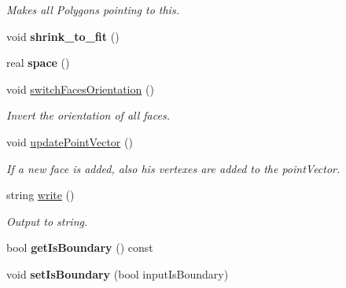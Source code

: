 \begin{DoxyCompactItemize}
\begin{DoxyCompactList}\small\item\em \-Makes all \-Polygons pointing to this. \end{DoxyCompactList}\item 
\hypertarget{class_polyhedron_a4972488920bf2dd7824175435829e475}{void {\bfseries shrink\-\_\-to\-\_\-fit} ()}\label{class_polyhedron_a4972488920bf2dd7824175435829e475}

\item 
\hypertarget{class_polyhedron_a7b3f6b30e464fd1448d21cb43eb6f80c}{real {\bfseries space} ()}\label{class_polyhedron_a7b3f6b30e464fd1448d21cb43eb6f80c}

\item 
\hypertarget{class_polyhedron_a7d8f448cc9f8bbcf4a1e05ee4f8feb2f}{void \hyperlink{class_polyhedron_a7d8f448cc9f8bbcf4a1e05ee4f8feb2f}{switch\-Faces\-Orientation} ()}\label{class_polyhedron_a7d8f448cc9f8bbcf4a1e05ee4f8feb2f}

\begin{DoxyCompactList}\small\item\em \-Invert the orientation of all faces. \end{DoxyCompactList}\item 
\hypertarget{class_polyhedron_a609105d8805177c2d0e6d7298632a507}{void \hyperlink{class_polyhedron_a609105d8805177c2d0e6d7298632a507}{update\-Point\-Vector} ()}\label{class_polyhedron_a609105d8805177c2d0e6d7298632a507}

\begin{DoxyCompactList}\small\item\em \-If a new face is added, also his vertexes are added to the point\-Vector. \end{DoxyCompactList}\item 
string \hyperlink{class_polyhedron_af611c2257de6a3a6a2f41a0c6c61e118}{write} ()
\begin{DoxyCompactList}\small\item\em \-Output to string. \end{DoxyCompactList}\item 
\hypertarget{class_polyhedron_acde3f89641eafdca70566d187f9b5ac7}{bool {\bfseries get\-Is\-Boundary} () const }\label{class_polyhedron_acde3f89641eafdca70566d187f9b5ac7}

\item 
\hypertarget{class_polyhedron_a71d09b5b7f19ef47e9518aa974e9c10c}{void {\bfseries set\-Is\-Boundary} (bool input\-Is\-Boundary)}\label{class_polyhedron_a71d09b5b7f19ef47e9518aa974e9c10c}


\end{DoxyCompactItemize}
